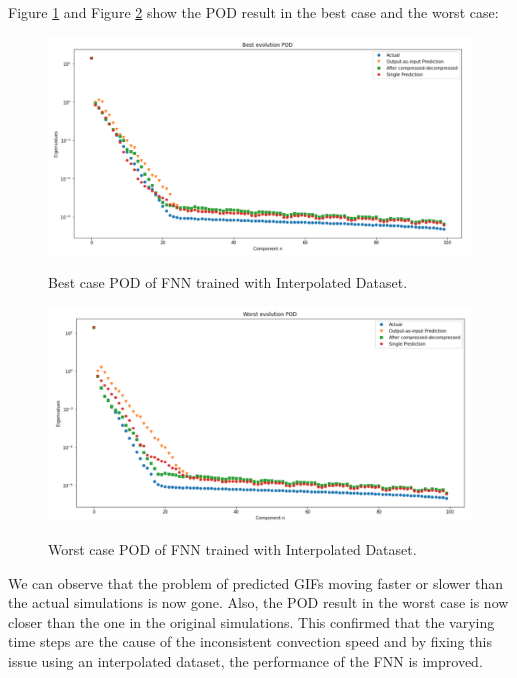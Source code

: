 Figure \ref{figure:FNN_interpolated_best_POD} and Figure \ref{figure:FNN_interpolated_worst_POD} show the POD result in the best case and the worst case:

\begin{figure}[H]
    \caption{Best case POD of FNN trained with Interpolated Dataset.}
    \includegraphics[scale=0.5]{figures/mantle_convection_images/larger_dataset_interpolated/FNN_Best_POD.png}
    \label{figure:FNN_interpolated_best_POD}
\end{figure}

\begin{figure}[H]
    \caption{Worst case POD of FNN trained with Interpolated Dataset.}
    \includegraphics[scale=0.5]{figures/mantle_convection_images/larger_dataset_interpolated/FNN_Worst_POD.png}
    \label{figure:FNN_interpolated_worst_POD}
\end{figure}

We can observe that the problem of predicted GIFs moving faster or slower than the actual simulations is now gone. Also, the POD result in the worst case is now closer than the one in the original simulations. This confirmed that the varying time steps are the cause of the inconsistent convection speed and by fixing this issue using an interpolated dataset, the performance of the FNN is improved.



